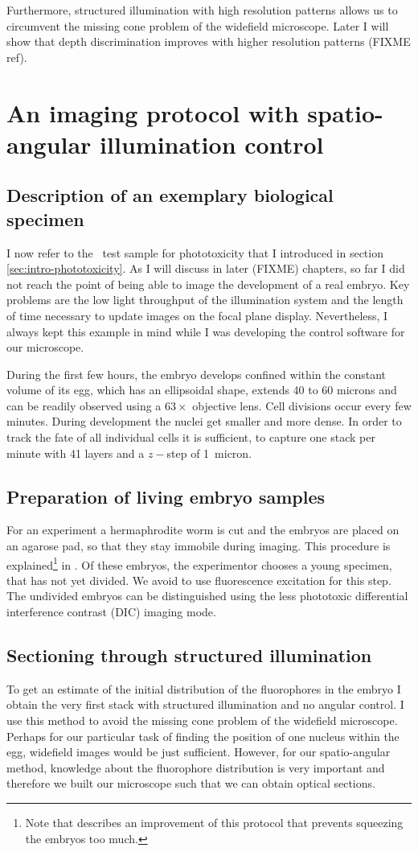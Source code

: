 Furthermore, structured illumination with high resolution patterns
allows us to circumvent the missing cone problem of the widefield
microscope.  Later I will show that depth discrimination improves with
higher resolution patterns (FIXME ref).
\section{An imaging protocol with spatio-angular illumination control}
\subsection{Description of an exemplary biological specimen} 
I now refer to the \celegans\ test sample for phototoxicity that I
introduced in section \ref{sec:intro-phototoxicity}. As I will discuss
in later (FIXME) chapters, so far I did not reach the point of being
able to image the development of a real embryo. Key problems are the
low light throughput of the illumination system and the length of time
necessary to update images on the focal plane display. Nevertheless, I
always kept this example in mind while I was developing the control
software for our microscope.

During the first few hours, the embryo develops confined within the
constant volume of its egg, which has an ellipsoidal shape, extends 40
to 60 microns and can be readily observed using a $63\times$ objective
lens. Cell divisions occur every few minutes.  During development the
nuclei get smaller and more dense. In order to track the fate of all
individual cells it is sufficient, to capture one stack per minute
with 41 layers and a $z-$step of 1~micron.
\subsection{Preparation of living embryo samples} 
For an experiment a hermaphrodite worm is cut and the embryos are
placed on an agarose pad, so that they stay immobile during
imaging. This procedure is explained\footnote{Note that
  \cite{Murray2006} describes an improvement of this protocol that
  prevents squeezing the embryos too much.} in \cite{Hope1999}. Of
these embryos, the experimentor chooses a young specimen, that has not
yet divided. We avoid to use fluorescence excitation for this step.
The undivided embryos can be distinguished using the less phototoxic
differential interference contrast (DIC) imaging mode.

\subsection{Sectioning through structured illumination} 
To get an estimate of the initial distribution of the fluorophores in
the embryo I obtain the very first stack with structured illumination
and no angular control. I use this method to avoid the missing cone
problem of the widefield microscope. Perhaps for our particular task
of finding the position of one nucleus within the egg, widefield
images would be just sufficient.  However, for our spatio-angular
method, knowledge about the fluorophore distribution is very important
and therefore we built our microscope such that we can obtain optical
sections.

